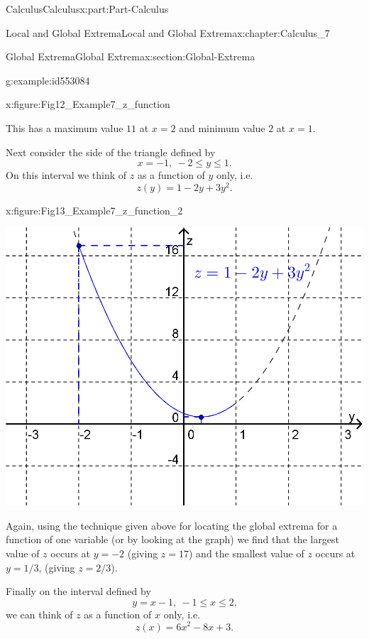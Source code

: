 \documentclass[oneside,10pt,]{book}
\numberwithin{equation}{section}
\begin{document}
\begin{partptx}{Calculus}{}{Calculus}{}{}{x:part:Part-Calculus}
\begin{chapterptx}{Local and Global Extrema}{}{Local and Global Extrema}{}{}{x:chapter:Calculus_7}
\begin{sectionptx}{Global Extrema}{}{Global Extrema}{}{}{x:section:Global-Extrema}
\begin{example}{}{g:example:id553084}
\begin{figureptx}{}{x:figure:Fig12_Example7_z_function}{}
\tcblower
\end{figureptx}%
This has a maximum value \(11\) at \(x=2\) and minimum value \(2\) at \(x=1\).%
\par
Next consider the side of the triangle defined by%
\begin{equation*}
x=-1, \: -2 \leq y \leq 1\text{.}
\end{equation*}
On this interval we think of \(z\) as a function of \(y\) only, i.e.%
\begin{equation*}
z(y) = 1-2y+3y^2\text{.}
\end{equation*}
%
\begin{figureptx}{}{x:figure:Fig13_Example7_z_function_2}{}%
\begin{image}{0.2}{0.6}{0.2}%
\includegraphics[width=\linewidth]{./Calculus/Images/7/Fig13_Example7_z_function_2.png}
\end{image}%
\tcblower
\end{figureptx}%
Again, using the technique given above for locating the global extrema for a function of one variable (or by looking at the graph) we find that the largest value of \(z\) occurs at \(y=-2\) (giving \(z=17\)) and the smallest value of \(z\) occurs at \(y=1/3\), (giving \(z=2/3\)).%
\par
Finally on the interval defined by%
\begin{equation*}
y=x-1, \: -1 \leq x \leq 2\text{,}
\end{equation*}
we can think of \(z\) as a function of \(x\) only, i.e.%
\begin{equation*}
z(x) = 6x^2-8x+3\text{.}
\end{equation*}

\end{example}
\end{sectionptx}
\end{chapterptx}
\end{partptx}
\end{document}
